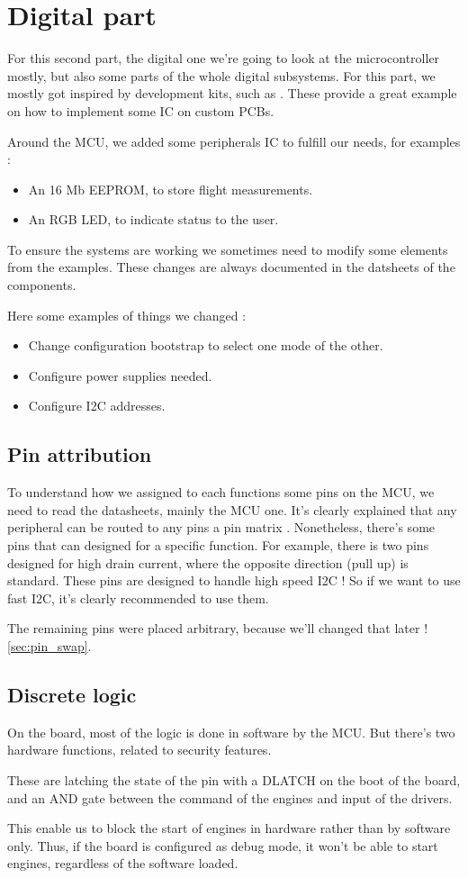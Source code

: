 \section{Digital part}
For this second part, the digital one we're going to look at the
microcontroller mostly, but also some parts of the whole digital subsystems.
For this part, we mostly got inspired by development kits, such as
\cite{nRF5340DK}. These provide a great example on how to implement some IC on
custom PCBs.

Around the MCU, we added some peripherals IC to fulfill our needs, for examples
:
\begin{itemize}[noitemsep]
    \item An 16 Mb EEPROM, to store flight measurements.
    \item An RGB LED, to indicate status to the user.
\end{itemize}

To ensure the systems are working we sometimes need to modify some elements
from the examples. These changes are always documented in the datsheets of the
components.

Here some examples of things we changed :
\begin{itemize}[noitemsep]
    \item   Change configuration bootstrap to select one mode of the other.
    \item   Configure power supplies needed.
    \item   Configure I2C addresses.
\end{itemize}

\subsection{Pin attribution}
To understand how we assigned to each functions some pins on the MCU, we need
to read the datasheets, mainly the MCU one. It's clearly explained that any
peripheral can be routed to any pins a pin matrix . Nonetheless, there's some
pins that can designed for a specific function. For example, there is two pins
designed for high drain current, where the opposite direction (pull up) is
standard. These pins are designed to handle high speed I2C ! So if we want to
use fast I2C, it's clearly recommended to use them.

The remaining pins were placed arbitrary, because we'll changed that later !
\ref{sec:pin_swap}.

\subsection{Discrete logic}\label{subsec:dis_logic}
On the board, most of the logic is done in software by the MCU. But there's two
hardware functions, related to security features.

These are latching the state of the pin with a DLATCH on the boot of the board,
and an AND gate between the command of the engines and input of the drivers.

This enable us to block the start of engines in hardware rather than by
software only. Thus, if the board is configured as debug mode, it won't be able
to start engines, regardless of the software loaded.
